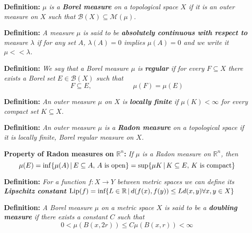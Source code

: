 \documentclass{article}
\begin{document}
\vspace{2ex}
\textbf{Definition:} \textit{$\mu$ is a \textbf{Borel measure} on a topological space $X$
if it is an outer measure on $X$ such that $\mathcal B(X)\subseteq\mathcal M(\mu)$.}

\vspace{2ex}
\textbf{Definition:} \textit{A measure $\mu$ is said to be \textbf{absolutely continuous
with respect to} measure $\lambda$ if for any set $A$, $\lambda(A)=0$
implies $\mu(A)=0$ and we write it $\mu << \lambda$.}

\vspace{2ex}
\textbf{Definition:} \textit{We say that a Borel measure $\mu$ is \textbf{regular} if
for every $F\subseteq X$ there exists a Borel set $E\in\mathcal B(X)$ such that
\[F\subseteq E,\quad\quad\quad\quad\quad\quad\mu(F)=\mu(E)\]}

\vspace{2ex}
\textbf{Definition:} \textit{An outer measure $\mu$ on $X$ is \textbf{locally finite} if
$\mu(K)<\infty$ for every compact set $K\subseteq X$.}

\vspace{2ex}
\textbf{Definition:} \textit{An outer measure $\mu$ is a \textbf{Radon measure} on a
topological space if it is locally finite, Borel regular measure on $X$.}

\vspace{2ex}
\textbf{Property of Radon measures on $\mathbb{R}^n$:} \textit{If $\mu$ is a Radon
measure on $\mathbb{R}^n$, then
\[
    \mu(E)=\inf\{\mu(A)\,|\,E\subseteq A,\,A\textnormal{ is open}\}
          =\sup\{\mu{K}\,|\,K\subseteq E,\,K\textnormal{ is compact}\}
\]}

\vspace{2ex}
\textbf{Definition:} \textit{For a function $f:X\rightarrow Y$ between metric spaces we can
define its \textbf{Lipschitz constant} $\text{Lip}(f) = \textnormal{inf}\{L\in
\mathbb{R}\,|\,d(f(x),f(y))\leq Ld(x,y) \forall x,y\in X\}$}

\vspace{2ex}
\textbf{Definition:} \textit{A Borel measure $\mu$ on a metric space $X$ is
said to be a \textbf{doubling measure} if there exists a constant $C$ such that
\[0<\mu(B(x,2r))\leq C\mu(B(x,r))<\infty\]}
\end{document}

